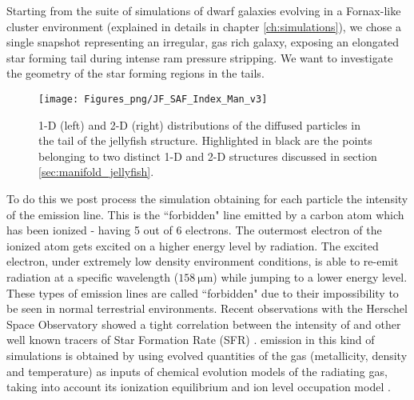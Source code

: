 Starting from the suite of simulations of dwarf galaxies evolving in a Fornax-like cluster environment (explained in details in chapter \ref{ch:simulations}),
we chose a single snapshot representing an irregular, gas rich galaxy, exposing an elongated star forming tail during intense ram pressure stripping.
We want to investigate the geometry of the star forming regions in the tails.
\begin{figure}[ht]
    \centering
    \texttt{[image: Figures\_png/JF\_SAF\_Index\_Man\_v3]}
    \caption{1-D (left) and 2-D (right) distributions of the diffused particles in the tail of the jellyfish structure.
    Highlighted in black are the points belonging to two distinct 1-D and 2-D structures discussed in section \ref{sec:manifold_jellyfish}.}
    \label{fig:JF_Res}
\end{figure}
To do this we post process the simulation obtaining for each particle the intensity of the \cii{} emission line.
This is the ``forbidden" line emitted by a carbon atom which has been ionized - having 5 out of 6 electrons.
The outermost electron of the ionized atom gets excited on a higher energy level by radiation.
The excited electron, under extremely low density environment conditions, is able to re-emit radiation at a specific wavelength ($158 ~ \mathrm{\mu m}$) while jumping to a lower energy level.
These types of emission lines are called ``forbidden" due to their impossibility to be seen in normal terrestrial environments.
Recent observations with the Herschel Space Observatory showed a tight correlation between the intensity of \cii{} and other well known tracers of Star Formation Rate (SFR) \cite{DeLooze2011, Herrera-Camus2015}.
\cii{} emission in this kind of simulations is obtained by using evolved quantities of the gas (metallicity, density and temperature) as inputs of chemical evolution models of the radiating gas, taking into account its ionization equilibrium and ion level occupation model \cite{Maio2007, DeRijcke2013}.

